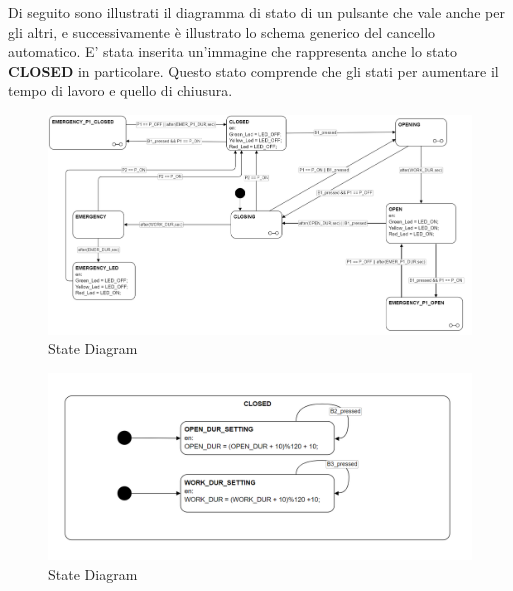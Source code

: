 \documentclass[12pt]{article}
\begin{document}
Di seguito sono illustrati il diagramma di stato di un pulsante che vale anche per gli altri, e successivamente è illustrato lo schema generico del cancello automatico. E' stata inserita un'immagine che rappresenta anche lo stato \textbf{CLOSED} in particolare. Questo stato comprende che gli stati per aumentare il tempo di lavoro e quello di chiusura.
\newpage
\begin{landscape}
\begin{figure}[h] %
    \centering %
    \includegraphics[width=1.5\textwidth]{state_diagram0.png} %
    \caption{State Diagram} %
    \label{fig:General State Diagram} %
\end{figure}
\end{landscape}

\begin{figure}[h] %
    \centering %
    \includegraphics[width=1\textwidth]{state_diagram1.png} %
    \caption{State Diagram} %
    \label{fig:CLOSED State} %
\end{figure}
\end{document}
